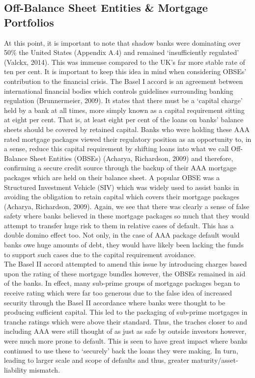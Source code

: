 \documentclass[11pt, english]{article}
\begin{document}
	\subsection{Off-Balance Sheet Entities \& Mortgage Portfolios}

	At this point, it is important to note that shadow banks were dominating over 50\% the United States (Appendix A.4) and remained `insufficiently regulated' (Valckx, 2014). This was immense compared to the UK's far more stable rate of ten per cent. It is important to keep this idea in mind when considering OBSEs' contribution to the financial crisis. The Basel I accord is an agreement between international financial bodies which controls guidelines surrounding banking regulation (Brunnermeier, 2009). It states that there must be a `capital charge' held by a bank at all times, more simply known as a capital requirement sitting at eight per cent. That is, at least eight per cent of the loans on banks' balance sheets should be covered by retained capital. Banks who were holding these AAA rated mortgage packages viewed their regulatory position as an opportunity to, in a sense, reduce this capital requirement by shifting loans into what we call Off-Balance Sheet Entities (OBSEs) (Acharya, Richardson, 2009) and therefore, confirming a secure credit source through the backup of their AAA mortgage packages which are held on their balance sheet. A popular OBSE was a Structured Investment Vehicle (SIV) which was widely used to assist banks in avoiding the obligation to retain capital which covers their mortgage packages (Acharya, Richardson, 2009). Again, we see that there was clearly a sense of false safety where banks believed in these mortgage packages so much that they would attempt to transfer huge risk to them in relative cases of default. This has a double domino effect too. Not only, in the case of AAA package default would banks owe huge amounts of debt, they would have likely been lacking the funds to support such cases due to the capital requirement avoidance.\\

	The Basel II accord attempted to amend this issue by introducing charges based upon the rating of these mortgage bundles however, the OBSEs remained in aid of the banks. In effect, many sub-prime groups of mortgage packages began to receive rating which were far too generous due to the false idea of increased security through the Basel II accordance where banks were thought to be producing sufficient capital. This led to the packaging of sub-prime mortgages in tranche ratings which were above their standard. Thus, the traches closer to and including AAA were still thought of as just as safe by outside investors however, were much more prone to default. This is seen to have great impact where banks continued to use these to `securely' back the loans they were making. In turn, leading to larger scale and scope of defaults and thus, greater maturity/asset-liability mismatch.\\
	
\end{document}
